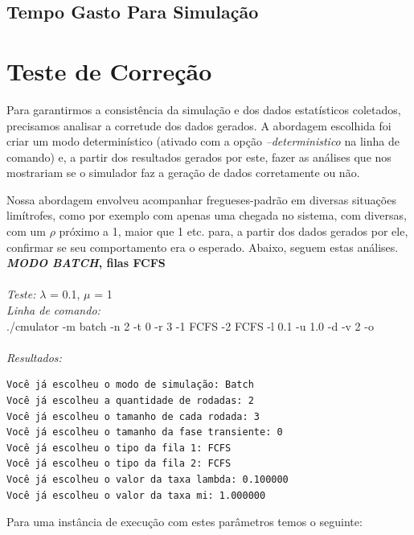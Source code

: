 \documentclass[a4paper,10pt]{article}
\begin{document}
\subsection{Tempo Gasto Para Simulação}

\pagebreak

\section{Teste de Correção}

    Para garantirmos a consistência da simulação e dos dados estatísticos coletados, precisamos analisar a corretude dos dados gerados. A abordagem escolhida foi criar um modo determinístico (ativado com a opção \emph{--deterministico} na linha de comando) e, a partir dos resultados gerados por este, fazer as análises que nos mostrariam se o simulador faz a geração de dados corretamente ou não.

    Nossa abordagem envolveu acompanhar fregueses-padrão em diversas situações limítrofes, como por exemplo com apenas uma chegada no sistema, com diversas, com um $\rho$ próximo a 1, maior que 1 etc. para, a partir dos dados gerados por ele, confirmar se seu comportamento era o esperado. Abaixo, seguem estas análises.
\\
\textbf{\emph{MODO BATCH}, filas FCFS}
\\
\\
\emph{Teste:} $\lambda$ = 0.1, $\mu$ = 1
\\
\emph{Linha de comando:}
\\
./cmulator -m batch -n 2 -t 0 -r 3 -1 FCFS -2 FCFS -l 0.1 -u 1.0 -d -v 2 -o
\\
\\
\emph{Resultados:}
\\
\begin{verbatim}
Você já escolheu o modo de simulação: Batch
Você já escolheu a quantidade de rodadas: 2
Você já escolheu o tamanho de cada rodada: 3
Você já escolheu o tamanho da fase transiente: 0
Você já escolheu o tipo da fila 1: FCFS
Você já escolheu o tipo da fila 2: FCFS
Você já escolheu o valor da taxa lambda: 0.100000
Você já escolheu o valor da taxa mi: 1.000000

\end{verbatim}
Para uma instância de execução com estes parâmetros temos o seguinte:
\end{document}
